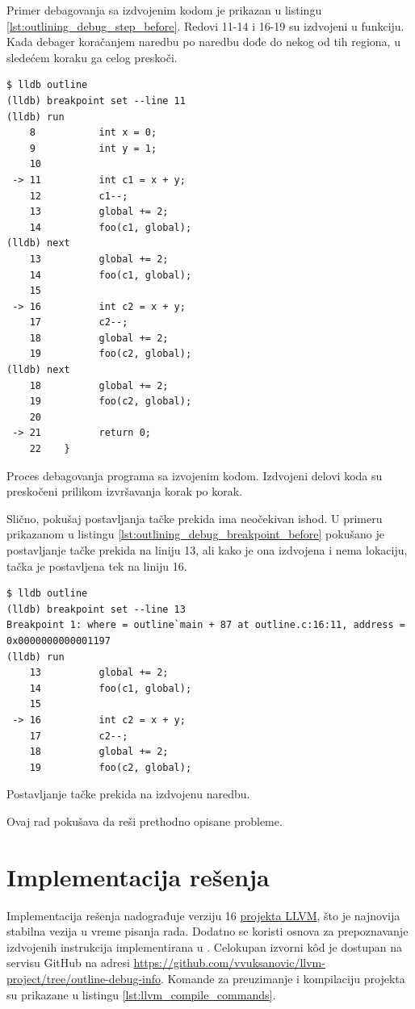 \documentclass[12pt,oneside]{memoir}
\begin{document}
Primer debagovanja sa izdvojenim kodom je prikazan u listingu \ref{lst:outlining_debug_step_before}.
Redovi 11-14 i 16-19 su izdvojeni u funkciju.
Kada debager koračanjem naredbu po naredbu dođe do nekog od tih regiona, u sledećem koraku ga celog preskoči.
\begin{listing}[!ht]
\begin{verbatim}
$ lldb outline
(lldb) breakpoint set --line 11
(lldb) run
    8           int x = 0;
    9           int y = 1;
    10          
 -> 11          int c1 = x + y;
    12          c1--;
    13          global += 2;
    14          foo(c1, global);
(lldb) next
    13          global += 2;
    14          foo(c1, global);
    15          
 -> 16          int c2 = x + y;
    17          c2--;
    18          global += 2;
    19          foo(c2, global);
(lldb) next
    18          global += 2;
    19          foo(c2, global);
    20          
 -> 21          return 0;
    22    }
\end{verbatim}
\caption{Proces debagovanja programa sa izvojenim kodom. Izdvojeni delovi koda su preskočeni prilikom izvršavanja korak po korak.}
\label{lst:outlining_debug_step_before}
\end{listing}
Slično, pokušaj postavljanja tačke prekida ima neočekivan ishod.
U primeru prikazanom u listingu \ref{lst:outlining_debug_breakpoint_before} pokušano je postavljanje tačke prekida na liniju 13, ali kako je ona izdvojena i nema lokaciju, tačka je postavljena tek na liniju 16.
\begin{listing}[!ht]
\begin{verbatim}
$ lldb outline
(lldb) breakpoint set --line 13
Breakpoint 1: where = outline`main + 87 at outline.c:16:11, address = 0x0000000000001197
(lldb) run
    13          global += 2;
    14          foo(c1, global);
    15
 -> 16          int c2 = x + y;
    17          c2--;
    18          global += 2;
    19          foo(c2, global);
\end{verbatim}
\caption{Postavljanje tačke prekida na izdvojenu naredbu.}
\label{lst:outlining_debug_breakpoint_before}
\end{listing}
Ovaj rad pokušava da reši prethodno opisane probleme.

\chapter{Implementacija rešenja}
\label{sec:implementation}

Implementacija rešenja nadograđuje verziju 16 \href{https://llvm.org/}{projekta LLVM}, što je najnovija stabilna vezija u vreme pisanja rada.
Dodatno se koristi osnova za prepoznavanje izdvojenih instrukcija implementirana u \cite{tomasevic2022autlajning}.
Celokupan izvorni k\^od je dostupan na servisu GitHub na adresi \url{https://github.com/vvuksanovic/llvm-project/tree/outline-debug-info}.
Komande za preuzimanje i kompilaciju projekta su prikazane u listingu \ref{lst:llvm_compile_commands}.
\end{document}
